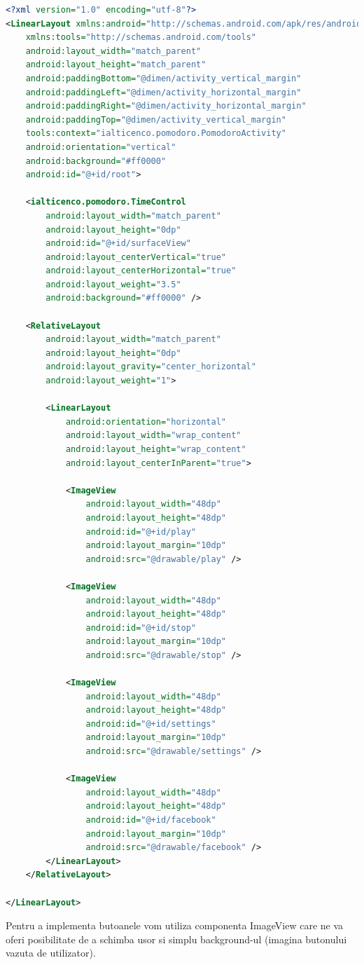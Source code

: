 \documentclass[12pt]{article}
\begin{document}
\begin{lstlisting}[language=xml, caption={Fisierul activity\_pomodoro.xml}, label=list2]
<?xml version="1.0" encoding="utf-8"?>
<LinearLayout xmlns:android="http://schemas.android.com/apk/res/android"
    xmlns:tools="http://schemas.android.com/tools"
    android:layout_width="match_parent"
    android:layout_height="match_parent"
    android:paddingBottom="@dimen/activity_vertical_margin"
    android:paddingLeft="@dimen/activity_horizontal_margin"
    android:paddingRight="@dimen/activity_horizontal_margin"
    android:paddingTop="@dimen/activity_vertical_margin"
    tools:context="ialticenco.pomodoro.PomodoroActivity"
    android:orientation="vertical"
    android:background="#ff0000"
    android:id="@+id/root">

    <ialticenco.pomodoro.TimeControl
        android:layout_width="match_parent"
        android:layout_height="0dp"
        android:id="@+id/surfaceView"
        android:layout_centerVertical="true"
        android:layout_centerHorizontal="true"
        android:layout_weight="3.5"
        android:background="#ff0000" />

    <RelativeLayout
        android:layout_width="match_parent"
        android:layout_height="0dp"
        android:layout_gravity="center_horizontal"
        android:layout_weight="1">

        <LinearLayout
            android:orientation="horizontal"
            android:layout_width="wrap_content"
            android:layout_height="wrap_content"
            android:layout_centerInParent="true">

            <ImageView
                android:layout_width="48dp"
                android:layout_height="48dp"
                android:id="@+id/play"
                android:layout_margin="10dp"
                android:src="@drawable/play" />

            <ImageView
                android:layout_width="48dp"
                android:layout_height="48dp"
                android:id="@+id/stop"
                android:layout_margin="10dp"
                android:src="@drawable/stop" />

            <ImageView
                android:layout_width="48dp"
                android:layout_height="48dp"
                android:id="@+id/settings"
                android:layout_margin="10dp"
                android:src="@drawable/settings" />

            <ImageView
                android:layout_width="48dp"
                android:layout_height="48dp"
                android:id="@+id/facebook"
                android:layout_margin="10dp"
                android:src="@drawable/facebook" />
        </LinearLayout>
    </RelativeLayout>

</LinearLayout>
\end{lstlisting}
Pentru a implementa butoanele vom utiliza componenta ImageView care ne va oferi posibilitate de a schimba usor si simplu background-ul (imagina butonului vazuta de utilizator). \newpage
\end{document}
